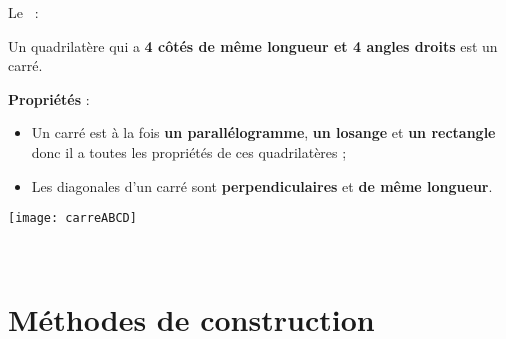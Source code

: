 \begin{definition}
Le  :

Un quadrilatère qui a \textcolor{C2}{\textbf{4 côtés de même longueur et 4 angles droits}} est un carré. \\[-3em]
\begin{minipage}[t]{0.7\linewidth}
\textcolor{H1}{\textbf{Propriétés}} :
\begin{itemize}
 \item Un carré est à la fois \textcolor{H1}{\textbf{un parallélogramme}}, \textcolor{H1}{\textbf{un losange}} et \textcolor{H1}{\textbf{un rectangle}} donc il a toutes les propriétés de ces quadrilatères ;
 \item Les diagonales d'un carré sont \textcolor{H1}{\textbf{perpendiculaires}} et \textcolor{H1}{\textbf{de même longueur}}.
 \end{itemize}
 \end{minipage}
 \begin{minipage}[c]{0.18\linewidth}
 \vspace{1cm}
 \centering
  \texttt{[image: carreABCD]}
  \end{minipage} \\
\end{definition}



\section{Méthodes de construction}


